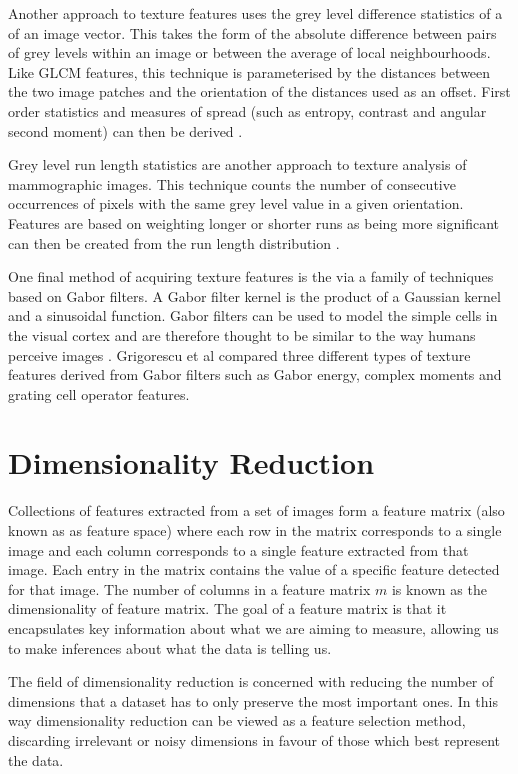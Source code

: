 Another approach to texture features uses the grey level difference statistics of a of an image vector. This takes the form of the absolute difference between pairs of grey levels within an image or between the average of local neighbourhoods. Like GLCM features, this technique is parameterised by the distances between the two image patches and the orientation of the distances used as an offset. First order statistics and measures of spread (such as entropy, contrast and angular second moment) can then be derived \cite{weszka1976comparative}.

Grey level run length statistics are another approach to texture analysis of mammographic images. This technique counts the number of consecutive occurrences of pixels with the same grey level value in a given orientation. Features are based on weighting longer or shorter runs as being more significant can then be created from the run length distribution \cite{weszka1976comparative, cheng2006approaches}.

One final method of acquiring texture features is the via a family of techniques based on Gabor filters. A Gabor filter kernel is the product of a Gaussian kernel and a  sinusoidal function. Gabor filters can be used to model the simple cells in the visual cortex and are therefore thought to be similar to the way humans perceive images \cite{marvcelja1980mathematical}. Grigorescu et al \cite{grigorescu2002comparison} compared three different types of texture features derived from Gabor filters such as Gabor energy, complex moments and grating cell operator features. 

\section{Dimensionality Reduction}
Collections of features extracted from a set of images form a feature matrix (also known as as feature space) where each row in the matrix corresponds to a single image and each column corresponds to a single feature extracted from that image. Each entry in the matrix contains the value of a specific feature detected for that image. The number of columns in a feature matrix $m$ is known as the dimensionality of feature matrix. The goal of a feature matrix is that it encapsulates key information about what we are aiming to measure, allowing us to make inferences about what the data is telling us.

The field of dimensionality reduction is concerned with reducing the number of dimensions that a dataset has to only preserve the most important ones. In this way dimensionality reduction can be viewed as a feature selection method, discarding irrelevant or noisy dimensions in favour of those which best represent the data.

